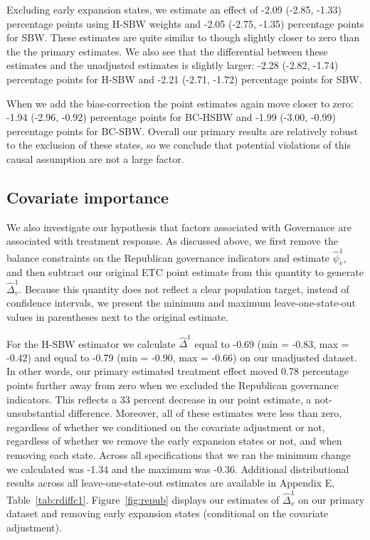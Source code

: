 \documentclass[article]{imsart}
\theoremstyle{plain}
\theoremstyle{remark}
\begin{document}
Excluding early expansion states, we estimate an effect of -2.09 (-2.85, -1.33) percentage points using H-SBW weights and -2.05 (-2.75, -1.35) percentage points for SBW. These estimates are quite similar to though slightly closer to zero than the the primary estimates. We also see that the differential between these estimates and the unadjusted estimates is slightly larger: -2.28  (-2.82, -1.74) percentage points for H-SBW and -2.21 (-2.71, -1.72) percentage points for SBW. 

When we add the bias-correction the point estimates again move closer to zero: -1.94 (-2.96, -0.92) percentage points for BC-HSBW and -1.99 (-3.00, -0.99) percentage points for BC-SBW. Overall our primary results are relatively robust to the exclusion of these states, so we conclude that potential violations of this causal assumption are not a large factor.

\subsection{Covariate importance}

We also investigate our hypothesis that factors associated with Governance are associated with treatment response. As discussed above, we first remove the balance constraints on the Republican governance indicators and estimate $\hat{\psi}^1_v$, and then subtract our original ETC point estimate from this quantity to generate $\hat{\Delta}_v^1$. Because this quantity does not reflect a clear population target, instead of confidence intervals, we present the minimum and maximum leave-one-state-out values in parentheses next to the original estimate.

For the H-SBW estimator we calculate $\hat{\Delta}^1$ equal to -0.69 (min = -0.83, max = -0.42) and equal to -0.79 (min = -0.90, max = -0.66) on our unadjusted dataset. In other words, our primary estimated treatment effect moved 0.78 percentage points further away from zero when we excluded the Republican governance indicators. This reflects a 33 percent decrease in our point estimate, a not-unsubstantial difference. Moreover, all of these estimates were less than zero, regardless of whether we conditioned on the covariate adjustment or not, regardless of whether we remove the early expansion states or not, and when removing each state. Across all specifications that we ran the minimum change we calculated was -1.34 and the maximum was -0.36. Additional distributional results across all leave-one-state-out estimates are available in Appendix E, Table~\ref{tab:rdiffc1}. Figure~\ref{fig:repub} displays our estimates of $\hat{\Delta}_v^1$ on our primary dataset and removing early expansion states (conditional on the covariate adjustment). 
\end{document}
